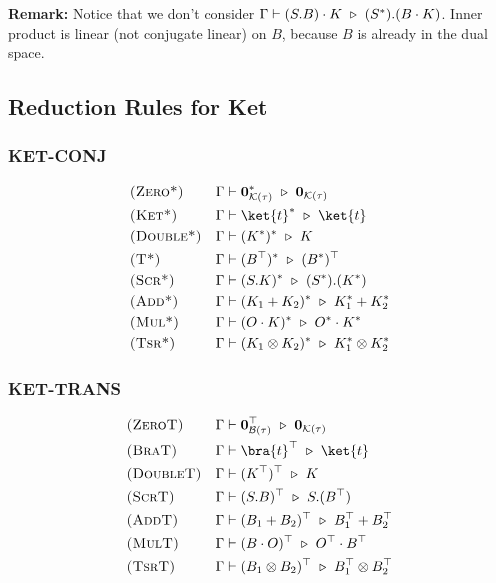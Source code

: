 \textbf{Remark:} Notice that we don't consider $\Gamma \vdash (S.B) \cdot K \ \triangleright\  (S^*).(B \cdot K)$. Inner product is linear (not conjugate linear) on $B$, because $B$ is already in the dual space.





\subsection{Reduction Rules for Ket}

\subsubsection*{\textsf{KET-CONJ}}
\begin{align*}
  & \textsc{(Zero*)} && \Gamma \vdash \zeroK{\tau}^* \reduce \zeroK{\tau} \\
  & \textsc{(Ket*)} && \Gamma \vdash \ket{t}^* \reduce \ket{t} \\
  & \textsc{(Double*)} && \Gamma \vdash (K^*)^* \reduce K \\
  & \textsc{(T*)} && \Gamma \vdash (B^\top)^* \reduce(B^*)^\top \\
  & \textsc{(Scr*)} && \Gamma \vdash (S.K)^* \reduce (S^*).(K^*) \\
  & \textsc{(Add*)} && \Gamma \vdash (K_1 + K_2)^* \reduce K_1^* + K_2^* \\
  & \textsc{(Mul*)} && \Gamma \vdash (O \cdot K)^* \reduce O^* \cdot K^* \\
  & \textsc{(Tsr*)} && \Gamma \vdash (K_1 \otimes K_2)^* \reduce K_1^* \otimes K_2^*
\end{align*}

\subsubsection*{\textsf{KET-TRANS}}
\begin{align*}
  & \textsc{(ZeroT)} && \Gamma \vdash \zeroB{\tau}^\top \reduce \zeroK{\tau} \\
  & \textsc{(BraT)} && \Gamma \vdash \bra{t}^\top \reduce \ket{t}\\
  & \textsc{(DoubleT)} && \Gamma \vdash (K^\top)^\top \reduce K \\
  & \textsc{(ScrT)} && \Gamma \vdash (S.B)^\top \reduce S.(B^\top) \\
  & \textsc{(AddT)} && \Gamma \vdash (B_1 + B_2)^\top \reduce B_1^\top + B_2^\top\\
  & \textsc{(MulT)} && \Gamma \vdash (B \cdot O)^\top \reduce O^\top \cdot B^\top \\
  & \textsc{(TsrT)} && \Gamma \vdash (B_1 \otimes B_2)^\top \reduce B_1^\top \otimes B_2^\top
\end{align*}

